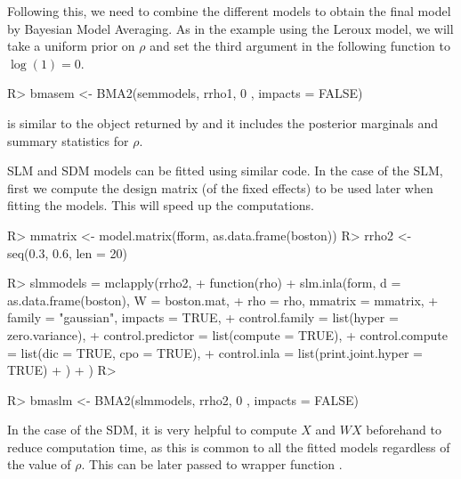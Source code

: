 \documentclass[article]{jss}
\begin{document}
\noindent
Following this, we need to combine the different models
to obtain the final model by Bayesian Model Averaging. As in the
example using the Leroux model, we will take
a uniform prior on $\rho$ and set the third argument in the following
function to $\log(1)=0$. 

\begin{Schunk}
\begin{Sinput}
R> bmasem <- BMA2(semmodels, rrho1, 0 , impacts = FALSE)
\end{Sinput}
\end{Schunk}

 is similar to the object returned by  and it
includes the posterior marginals and summary statistics for $\rho$.

SLM and SDM models can be fitted using similar code. In the case of
the SLM, first we compute the design matrix (of the fixed effects) 
to be used later when fitting the models. This will speed up the 
computations.

\begin{Schunk}
\begin{Sinput}
R> mmatrix <- model.matrix(fform, as.data.frame(boston))
R> rrho2 <- seq(0.3, 0.6, len = 20)
\end{Sinput}
\end{Schunk}

\begin{Schunk}
\begin{Sinput}
R> slmmodels = mclapply(rrho2,
+          function(rho) {
+                  slm.inla(form, d = as.data.frame(boston), W = boston.mat, 
+  			rho = rho, mmatrix = mmatrix,
+                          family = "gaussian", impacts = TRUE,
+                          control.family = list(hyper = zero.variance),
+                          control.predictor = list(compute = TRUE),
+                          control.compute = list(dic = TRUE, cpo = TRUE),
+                          control.inla = list(print.joint.hyper = TRUE)
+                  )
+          })
R> 
\end{Sinput}
\end{Schunk}

\begin{Schunk}
\begin{Sinput}
R> bmaslm <- BMA2(slmmodels, rrho2, 0 , impacts = FALSE)
\end{Sinput}
\end{Schunk}

In the case of the SDM, it is very helpful to compute $X$ and $WX$ beforehand
to reduce computation time, as this is common to all the fitted models
regardless of the value of $\rho$. This can be later passed to wrapper function
.
\end{document}
